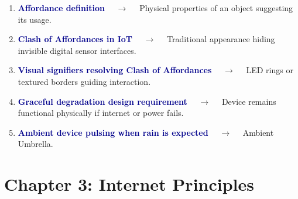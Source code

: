 \documentclass[11pt,a4paper]{article}
\begin{document}
\begin{enumerate}[label=\arabic*., leftmargin=*, labelsep=0.8em, itemsep=0.35em, parsep=0.1em, topsep=0.2em]
  \item \textcolor{darkblue}{\textbf{Affordance definition}} $\quad\to\quad$ Physical properties of an object suggesting its usage.
  \item \textcolor{darkblue}{\textbf{Clash of Affordances in IoT}} $\quad\to\quad$ Traditional appearance hiding invisible digital sensor interfaces.
  \item \textcolor{darkblue}{\textbf{Visual signifiers resolving Clash of Affordances}} $\quad\to\quad$ LED rings or textured borders guiding interaction.
  \item \textcolor{darkblue}{\textbf{Graceful degradation design requirement}} $\quad\to\quad$ Device remains functional physically if internet or power fails.
  \item \textcolor{darkblue}{\textbf{Ambient device pulsing when rain is expected}} $\quad\to\quad$ Ambient Umbrella.
\end{enumerate}

\section*{Chapter 3: Internet Principles}
\end{document}

